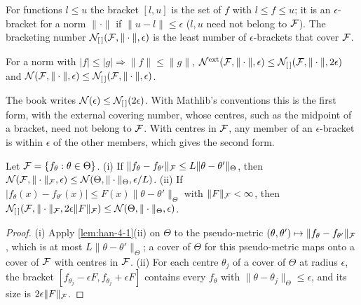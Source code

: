 \begin{definition}
  \label{def:han-4-14}
  For functions $l\le u$ the bracket $[l,u]$ is the set of $f$ with $l\le f\le u$; it is an $\epsilon$-bracket for a norm $\|\cdot\|$ if $\|u-l\|\le\epsilon$ ($l,u$ need not belong to $\mathcal{F}$). The bracketing number $\mathcal{N}_{[\,]}(\mathcal{F},\|\cdot\|,\epsilon)$ is the least number of $\epsilon$-brackets that cover $\mathcal{F}$.
\end{definition}

\begin{lemma}
  \label{lem:han-4-9}
  For a norm with $|f|\le|g|\Rightarrow\|f\|\le\|g\|$,
  $\mathcal{N}^{\mathrm{ext}}(\mathcal{F},\|\cdot\|,\epsilon)\le\mathcal{N}_{[\,]}(\mathcal{F},\|\cdot\|,2\epsilon)$ and $\mathcal{N}(\mathcal{F},\|\cdot\|,\epsilon)\le\mathcal{N}_{[\,]}(\mathcal{F},\|\cdot\|,\epsilon)$.
\end{lemma}
\begin{remark}
  The book writes $\mathcal{N}(\epsilon)\le\mathcal{N}_{[\,]}(2\epsilon)$. With Mathlib's conventions this is the first form, with the external covering number, whose centres, such as the midpoint of a bracket, need not belong to $\mathcal{F}$. With centres in $\mathcal{F}$, any member of an $\epsilon$-bracket is within $\epsilon$ of the other members, which gives the second form.
\end{remark}

\begin{theorem}
  \label{thm:han-4-13}
  Let $\mathcal{F}=\{f_\theta:\theta\in\Theta\}$. (i) If $\|f_\theta-f_{\theta'}\|_{\mathcal{F}}\le L\|\theta-\theta'\|_\Theta$, then $\mathcal{N}(\mathcal{F},\|\cdot\|_{\mathcal{F}},\epsilon)\le\mathcal{N}(\Theta,\|\cdot\|_\Theta,\epsilon/L)$. (ii) If $|f_\theta(x)-f_{\theta'}(x)|\le F(x)\|\theta-\theta'\|_\Theta$ with $\|F\|_{\mathcal{F}}<\infty$, then $\mathcal{N}_{[\,]}(\mathcal{F},\|\cdot\|_{\mathcal{F}},2\epsilon\|F\|_{\mathcal{F}})\le\mathcal{N}(\Theta,\|\cdot\|_\Theta,\epsilon)$.
\end{theorem}
\begin{proof}
  (i) Apply \cref{lem:han-4-1}(ii) on $\Theta$ to the pseudo-metric $(\theta,\theta')\mapsto\|f_\theta-f_{\theta'}\|_{\mathcal{F}}$, which is at most $L\|\theta-\theta'\|_\Theta$; a cover of $\Theta$ for this pseudo-metric maps onto a cover of $\mathcal{F}$ with centres in $\mathcal{F}$. (ii) For each centre $\theta_j$ of a cover of $\Theta$ at radius $\epsilon$, the bracket $[f_{\theta_j}-\epsilon F,f_{\theta_j}+\epsilon F]$ contains every $f_\theta$ with $\|\theta-\theta_j\|_\Theta\le\epsilon$, and its size is $2\epsilon\|F\|_{\mathcal{F}}$.
\end{proof}
